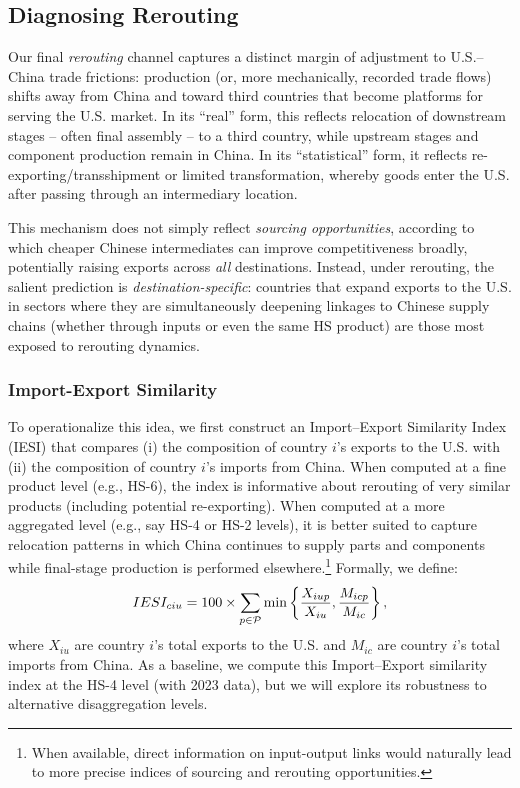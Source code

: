 \documentclass[english,12pt]{article}
\theoremstyle{definition}
\begin{document}
\begin{table}[htbp]
\caption{Top 20 economies by $\boldsymbol{SGI}_{dc}$}
\label{tab:top20_spdi}\centering

\end{table}



\subsection{Diagnosing Rerouting}

Our final \emph{rerouting} channel captures a distinct margin of adjustment to
U.S.--China trade frictions: production (or, more mechanically, recorded
trade flows) shifts away from China and toward third countries that become
platforms for serving the U.S. market. In its ``real'' form, this reflects
relocation of downstream stages -- often final assembly -- to a third
country, while upstream stages and component production remain in China. In
its ``statistical'' form, it reflects re-exporting/transshipment or limited
transformation, whereby goods enter the U.S. after passing through an
intermediary location.

This mechanism does not simply reflect \emph{sourcing opportunities},
according to which cheaper Chinese intermediates can improve competitiveness
broadly, potentially raising exports across \emph{all} destinations.
Instead, under rerouting, the salient prediction is \emph{%
destination-specific}: countries that expand exports to the U.S. in sectors
where they are simultaneously deepening linkages to Chinese supply chains
(whether through inputs or even the same HS product) are those most exposed
to rerouting dynamics.

\subsubsection*{Import-Export Similarity}

To operationalize this idea, we first construct an Import--Export Similarity
Index (IESI) that compares (i) the composition of country $i$'s exports to
the U.S. with (ii) the composition of country $i$'s imports from China. When
computed at a fine product level (e.g., HS-6), the index is informative
about rerouting of very similar products (including potential re-exporting).
When computed at a more aggregated level (e.g., say HS-4 or HS-2 levels), it
is better suited to capture relocation patterns in which China continues to
supply parts and components while final-stage production is performed
elsewhere.\footnote{%
When available, direct information on input-output links would naturally
lead to more precise indices of sourcing and rerouting opportunities.}
Formally, we define:%
\begin{equation}
IESI_{ciu}=100 \times \sum_{p\in \mathcal{P}}\min \left\{ \frac{X_{iup}}{X_{iu}},\frac{%
M_{icp}}{M_{ic}}\right\} ,  \label{eq: Imp Exp Similarity}
\end{equation}%
where $X_{iu}$ are country $i$'s total exports to the U.S. and $M_{ic}$ are
country $i$'s total imports from China. As a baseline, we compute this Import--Export similarity index at the HS-4
level (with 2023 data), but we will explore its robustness to alternative
disaggregation levels.
\end{document}
